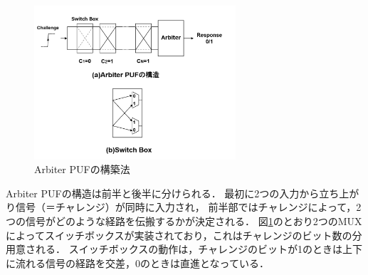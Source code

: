 \documentclass[technicalreport]{ieicej} %
\begin{document}
\begin{figure}[tb]
  \begin{center}
    \includegraphics[width=75mm]{Apuf.png}
  \end{center}
  \caption{Arbiter PUFの構築法}
  \label{APUF}
\end{figure}
Arbiter PUFの構造は前半と後半に分けられる．
最初に2つの入力から立ち上がり信号（＝チャレンジ）が同時に入力され，
前半部ではチャレンジによって，2つの信号がどのような経路を伝搬するかが決定される．
図\ref{APUF}のとおり2つのMUXによってスイッチボックスが実装されており，これはチャレンジのビット数の分用意される．
スイッチボックスの動作は，チャレンジのビットが1のときは上下に流れる信号の経路を交差，0のときは直進となっている．
\end{document}
